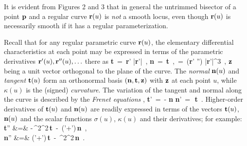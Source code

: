It is evident from Figures 2 and 3 that in general the untrimmed
bisector of a point ${\bf p}$ and a regular curve ${\bf r}(u)$ is
{\it not\/} a smooth locus, even though ${\bf r}(u)$ is necessarily
smooth if it has a regular parameterization.

Recall \cite{kreyszig59} that for any regular parametric curve
${\bf r}(u)$, the elementary differential characteristics at each
point may be expressed in terms of the parametric derivatives
${\bf r}'(u),{\bf r}''(u),\ldots$ there as
\be \label{diffchar}
{\bf t} \,=\, {{\bf r}' \over |{\bf r}'|} \,, \quad
{\bf n} \,=\, {\bf t}  \,, \quad
\kappa \,=\, {({\bf r}' '') 
  \over |{\bf r}'|^3} \,,
\ee
${\bf z}$ being a unit vector orthogonal to the plane of the curve.
The {\it normal\/} ${\bf n}(u)$ and {\it tangent\/} ${\bf t}(u)$ form
an orthonormal basis $({\bf n},{\bf t},{\bf z})$ with ${\bf z}$ at
each point $u$, while $\kappa(u)$ is the (signed) {\it curvature}.
The variation of the tangent and normal along the curve is described
by the {\it Frenet equations} \cite{kreyszig59},
\be \label{frenet}
{\bf t}' \,=\, -\,\sigma\kappa\,{\bf n}
 \quad
{\bf n}' \,=\, \sigma\kappa\,{\bf t} \,.
\ee
Higher-order derivatives of ${\bf t}(u)$ and ${\bf n}(u)$ are readily
expressed in terms of the vectors ${\bf t}(u)$, ${\bf n}(u)$ and the
scalar functions $\sigma(u)$, $\kappa(u)$ and their derivatives; for
example:
\ba \label{frenet2}
{\bf t}'' &=& -\,\sigma^2\kappa^2\,{\bf t} \,-\,
(\sigma'\kappa+\sigma\kappa')\,{\bf n} \,, \nonumber \\
{\bf n}'' &=& (\sigma'\kappa+\sigma\kappa')\,{\bf t}
 \,-\, \sigma^2\kappa^2\,{\bf n} \,.
\ea

